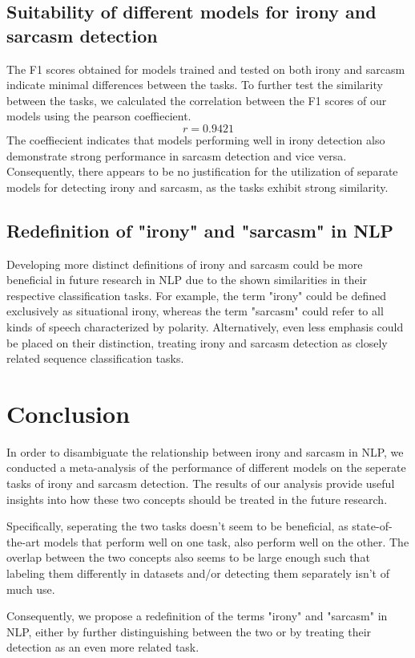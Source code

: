 \documentclass[10pt, a4paper]{article}
\begin{document}
\subsection{Suitability of different models for irony and sarcasm detection}
The F1 scores obtained for models trained and tested on both irony and sarcasm indicate minimal differences between the tasks.
To further test the similarity between the tasks, we calculated the correlation between the F1 scores of our models using the pearson coeffiecient.
$$
r = 0.9421
$$
The coeffiecient indicates that models performing well in irony detection also demonstrate strong performance in sarcasm detection and vice versa. 
Consequently, there appears to be no justification for the utilization of separate models for detecting irony and sarcasm, as the tasks exhibit strong
similarity.
\subsection{Redefinition of "irony" and "sarcasm" in NLP}
Developing more distinct definitions of irony and sarcasm could be more beneficial in future research in NLP due to the shown 
similarities in their respective classification tasks. For example, the term "irony" could be 
defined exclusively as situational irony, whereas the term "sarcasm" could refer to all kinds of speech characterized by polarity.
Alternatively, even less emphasis could be placed on their distinction, treating irony and sarcasm detection
as closely related sequence classification tasks.
\section{Conclusion}
In order to disambiguate the relationship between irony and sarcasm in NLP, we conducted a meta-analysis of the performance of different models on the 
seperate tasks of irony and sarcasm detection. The results of our analysis provide useful insights into how these two concepts should be treated in the
future research.

Specifically, seperating the two tasks doesn't seem to be beneficial, as state-of-the-art models that perform well on one task, also perform
well on the other. The overlap between the two concepts also seems to be large enough such that labeling them differently in datasets and/or 
detecting them separately isn't of much use.

Consequently, we propose a redefinition of the terms "irony" and "sarcasm" in NLP, either by further distinguishing between the two or by treating
their detection as an even more related task.

 
\end{document}
